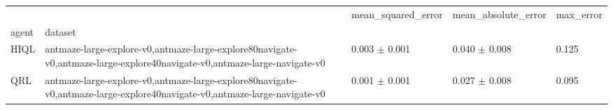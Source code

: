 \begin{tabular}{lllll}
\toprule
 &  & mean_squared_error & mean_absolute_error & max_error \\
agent & dataset &  &  &  \\
\midrule
HIQL & antmaze-large-explore-v0,antmaze-large-explore80navigate-v0,antmaze-large-explore40navigate-v0,antmaze-large-navigate-v0 & 0.003 $\pm$ 0.001 & 0.040 $\pm$ 0.008 & 0.125 \\
\cline{1-5}
QRL & antmaze-large-explore-v0,antmaze-large-explore80navigate-v0,antmaze-large-explore40navigate-v0,antmaze-large-navigate-v0 & 0.001 $\pm$ 0.001 & 0.027 $\pm$ 0.008 & 0.095 \\
\cline{1-5}
\bottomrule
\end{tabular}
